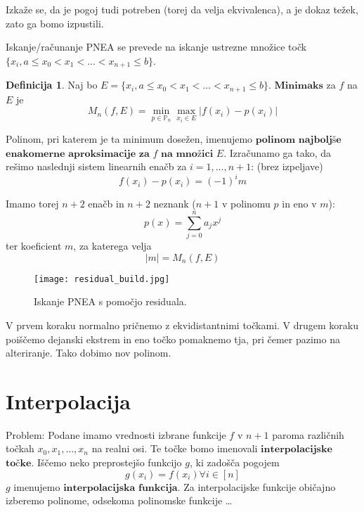\documentclass[a4paper,12pt]{article}
\theoremstyle{definition}
\newtheorem{defn}[counter]{Definicija}
\theoremstyle{remark}
\newcommand{\Pp}{\mathbb{P}}
\begin{document}
Izkaže se, da je pogoj tudi potreben (torej da velja ekvivalenca), a je dokaz težek, zato ga bomo izpustili.

Iskanje/računanje PNEA se prevede na iskanje ustrezne množice točk $\{x_i, a \leq x_0 < x_1 < \dots < x_{n+1} \leq b\}$.

\begin{defn}
    Naj bo $E = \{x_i, a \leq x_0 < x_1 < \dots < x_{n+1} \leq b\}$. $\textbf{Minimaks}$ za $f$ na $E$ je
    \begin{equation*}
        M_n (f, E) = \min_{p \in \Pp_n} \max_{x_i \in E} \left| f(x_i) - p(x_i) \right|
    \end{equation*}
\end{defn}

Polinom, pri katerem je ta minimum dosežen, imenujemo $\textbf{polinom}$ $\textbf{najboljše}$ $\textbf{enakomerne}$ $\textbf{aproksimacije}$ $\textbf{za}$ $f$
$\textbf{na}$ $\textbf{množici}$ $E$. Izračunamo ga tako, da rešimo naslednji sistem linearnih enačb za $i = 1, \dots, n+1$: (brez izpeljave)
\begin{equation*}
    f(x_i) - p(x_i) = (-1)^i m
\end{equation*}

Imamo torej $n+2$ enačb in $n+2$ neznank ($n + 1$ v polinomu $p$ in eno v $m$):
\begin{equation*}
    p(x) = \sum_{j = 0}^{n} a_j x^j
\end{equation*}
ter koeficient $m$, za katerega velja
\begin{equation*}
    \left| m \right| = M_n (f, E)
\end{equation*}

\begin{figure}[H]
    \center
    \texttt{[image: residual\_build.jpg]}
    \caption{Iskanje PNEA s pomočjo residuala.}
\end{figure}

V prvem koraku normalno pričnemo z ekvidistantnimi točkami. V drugem koraku poiščemo dejanski ekstrem in eno točko pomaknemo tja, pri čemer pazimo na alteriranje. Tako dobimo nov polinom.


\newpage
\section{Interpolacija}
Problem: Podane imamo vrednosti izbrane funkcije $f$ v $n+1$ paroma različnih točkah $x_0, x_1, \dots, x_n$ na realni osi. Te točke bomo imenovali
$\textbf{interpolacijske}$ $\textbf{točke}$. Iščemo neko preprostejšo funkcijo $g$, ki zadošča pogojem
\begin{equation*}
    g(x_i) = f(x_i) \forall i \in [n]
\end{equation*}
$g$ imenujemo $\textbf{interpolacijska}$ $\textbf{funkcija}$. Za interpolacijske funkcije običajno izberemo polinome, odsekoma polinomske funkcije \dots
\end{document}
